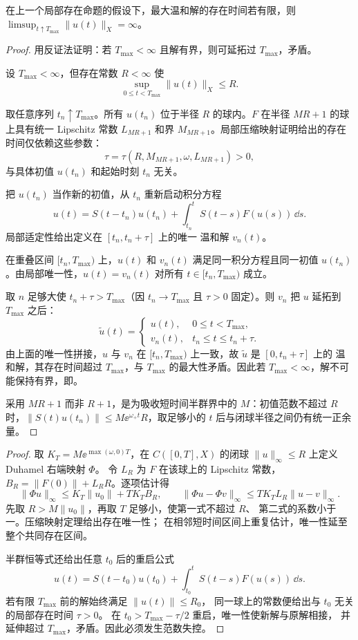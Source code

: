 \begin{proposition}[有界球上统一存在时间给出爆破择一]
在上一个局部存在命题的假设下，最大温和解的存在时间若有限，则 $\limsup_{t\uparrow T_{\max}}\|u(t)\|_X=\infty$。
\end{proposition}
\begin{proof}
用反证法证明：若 $T_{\max}<\infty$ 且解有界，则可延拓过 $T_{\max}$，矛盾。

设 $T_{\max}<\infty$，但存在常数 $R<\infty$ 使
\[
  \sup_{0\le t<T_{\max}}\|u(t)\|_X\le R.
\]

取任意序列 $t_n\uparrow T_{\max}$。所有 $u(t_n)$ 位于半径 $R$ 的球内。$F$ 在半径 $M R+1$ 的球上具有统一 Lipschitz 常数 $L_{MR+1}$ 和界 $M_{MR+1}$。局部压缩映射证明给出的存在时间仅依赖这些参数：
\[
  \tau=\tau(R,M_{MR+1},\omega,L_{MR+1})>0,
\]
与具体初值 $u(t_n)$ 和起始时刻 $t_n$ 无关。

把 $u(t_n)$ 当作新的初值，从 $t_n$ 重新启动积分方程
\[
  u(t)=S(t-t_n)u(t_n)+\int_{t_n}^t S(t-s)F(u(s))\,\dd s.
\]
局部适定性给出定义在 $[t_n,t_n+\tau]$ 上的唯一 温和解 $v_n(t)$。

在重叠区间 $[t_n,T_{\max})$ 上，$u(t)$ 和 $v_n(t)$ 满足同一积分方程且同一初值 $u(t_n)$。由局部唯一性，$u(t)=v_n(t)$ 对所有 $t\in[t_n,T_{\max})$ 成立。

取 $n$ 足够大使 $t_n+\tau>T_{\max}$（因 $t_n\to T_{\max}$ 且 $\tau>0$ 固定）。则 $v_n$ 把 $u$ 延拓到 $T_{\max}$ 之后：
\[
  \tilde u(t)=\begin{cases}u(t),&0\le t<T_{\max},\\ v_n(t),&t_n\le t\le t_n+\tau.\end{cases}
\]
由上面的唯一性拼接，$u$ 与 $v_n$ 在 $[t_n,T_{\max})$ 上一致，故 $\tilde u$ 是 $[0,t_n+\tau]$ 上的 温和解，其存在时间超过 $T_{\max}$，与 $T_{\max}$ 的最大性矛盾。因此若 $T_{\max}<\infty$，解不可能保持有界，即。


采用 $MR+1$ 而非 $R+1$，是为吸收短时间半群界中的 $M$：初值范数不超过 $R$ 时，$\|S(t)u(t_n)\|\le M\ee^{\omega_+t}R$，取足够小的 $t$ 后与闭球半径之间仍有统一正余量。
\end{proof}

\begin{proof}
取 $K_T=M\ee^{\max(\omega,0)T}$，在 $C([0,T],X)$ 的闭球
$\|u\|_\infty\le R$ 上定义 Duhamel 右端映射 $\Phi$。
令 $L_R$ 为 $F$ 在该球上的 Lipschitz 常数，
$B_R=\|F(0)\|+L_RR$。逐项估计得
\[
\|\Phi u\|_\infty\le K_T\|u_0\|+TK_TB_R,
\qquad
\|\Phi u-\Phi v\|_\infty\le TK_TL_R\|u-v\|_\infty.
\]
先取 $R>M\|u_0\|$，再取 $T$ 足够小，使第一式不超过 $R$、
第二式的系数小于一。压缩映射定理给出存在唯一性；
在相邻短时间区间上重复估计，唯一性延至整个共同存在区间。

半群恒等式还给出任意 $t_0$ 后的重启公式
\[
u(t)=S(t-t_0)u(t_0)+\int_{t_0}^tS(t-s)F(u(s))\,\dd s.
\]
若有限 $T_{\max}$ 前的解始终满足 $\|u(t)\|\le R_0$，
同一球上的常数便给出与 $t_0$ 无关的局部存在时间 $\tau>0$。
在 $t_0>T_{\max}-\tau/2$ 重启，唯一性使新解与原解相接，
并延伸超过 $T_{\max}$，矛盾。因此必须发生范数失控。
\end{proof}


